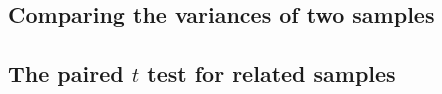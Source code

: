 \documentclass[t]{beamer} %
\begin{document}
\begin{frame}
  \frametitle{}

\end{frame}

\begin{frame}
  \frametitle{}

\end{frame}

\begin{frame}[fragile]
  \frametitle{}

  \begin{alltt}
  \end{alltt}
\end{frame}

\subsection{Comparing the variances of two samples}

\begin{frame}
  \frametitle{}

\end{frame}

\begin{frame}[fragile]
  \frametitle{}

  \begin{alltt}
  \end{alltt}
\end{frame}

\subsection{The paired $t$ test for related samples}

\begin{frame}
  \frametitle{}

\end{frame}

\begin{frame}[fragile]
  \frametitle{}

  \begin{alltt}
  \end{alltt}
\end{frame}

\end{document}
